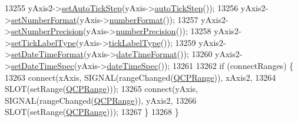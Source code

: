 \begin{DoxyCode}
13255   yAxis2->\hyperlink{class_q_c_p_axis_a99fe77b034e06f5b723995beab96e741}{setAutoTickStep}(yAxis->\hyperlink{class_q_c_p_axis_ae762920261b0c24beb56b893e5a2471d}{autoTickStep}());
13256   yAxis2->\hyperlink{class_q_c_p_axis_ae585a54dc2aac662e90a2ca82f002590}{setNumberFormat}(yAxis->\hyperlink{class_q_c_p_axis_ae6729b40845b29ffa5a440aa53cec215}{numberFormat}());
13257   yAxis2->\hyperlink{class_q_c_p_axis_a21dc8023ad7500382ad9574b48137e63}{setNumberPrecision}(yAxis->\hyperlink{class_q_c_p_axis_a91cb2825060ac79a889296377fe0c7c1}{numberPrecision}());
13258   yAxis2->\hyperlink{class_q_c_p_axis_a54f24f5ce8feea25209388a863d7e448}{setTickLabelType}(yAxis->\hyperlink{class_q_c_p_axis_a8a6f58a1ce12cfc4fadd379167668e8d}{tickLabelType}());
13259   yAxis2->\hyperlink{class_q_c_p_axis_a2ee0191daa03524a682113e63e05f7a7}{setDateTimeFormat}(yAxis->\hyperlink{class_q_c_p_axis_a132b54ae184a12ed24c9af24f53dc70b}{dateTimeFormat}());
13260   yAxis2->\hyperlink{class_q_c_p_axis_a262e06731debed7eee11fa6a81d67eaf}{setDateTimeSpec}(yAxis->\hyperlink{class_q_c_p_axis_afdd04c56ed29a9d948f840fc76f0d383}{dateTimeSpec}());
13261 
13262   \textcolor{keywordflow}{if} (connectRanges) \{
13263     connect(xAxis, SIGNAL(rangeChanged(\hyperlink{class_q_c_p_range}{QCPRange})), xAxis2,
13264             SLOT(setRange(\hyperlink{class_q_c_p_range}{QCPRange})));
13265     connect(yAxis, SIGNAL(rangeChanged(\hyperlink{class_q_c_p_range}{QCPRange})), yAxis2,
13266             SLOT(setRange(\hyperlink{class_q_c_p_range}{QCPRange})));
13267   \}
13268 \}
\end{DoxyCode}


